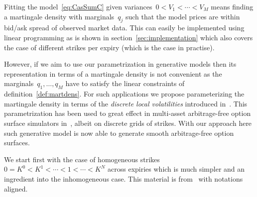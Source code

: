 \documentclass[twoside]{article}
\theoremstyle{plain}
\theoremstyle{definition}
\theoremstyle{remark}
\begin{document}
Fitting the  model~\eqref{eq:CasSumC} given variances~$0<V_1<\cdots<V_M$
means finding a martingale density with marginals~$q_j$ such that the model
prices are within bid/ask spread of observed market data. This can easily be
implemented using linear programming as is shown in section~\ref{sec:implementation}
which also covers the case of different strikes per expiry (which is the
case in practise).

However, if we aim to use our parametrization in generative models then
its representation in terms of a  martingale density is not convenient as 
the marginals~$q_1,\ldots,q_M$
have to satisfy the linear constraints of definition~\ref{def:martdens}. 
For such applications we propose parameterizing the martingale density in terms of
the \emph{discrete local volatilities} introduced in~\cite{DLV}. This parametrization
has been used to great effect in  multi-asset arbitrage-free 
option surface simulators in~\cite{wiese2021multiassetspotoptionmarket}, albeit
on discrete grids of strikes.
With our approach here
such generative model is now able to generate smooth arbitrage-free option surfaces.

We start first with the case of homogeneous strikes $0=K^0<K^1<\cdots<1<\cdots<K^N$
across expiries which is much simpler and an ingredient into the inhomogeneous case.
This material is from~\cite{DLV} with notations aligned.
\end{document}
